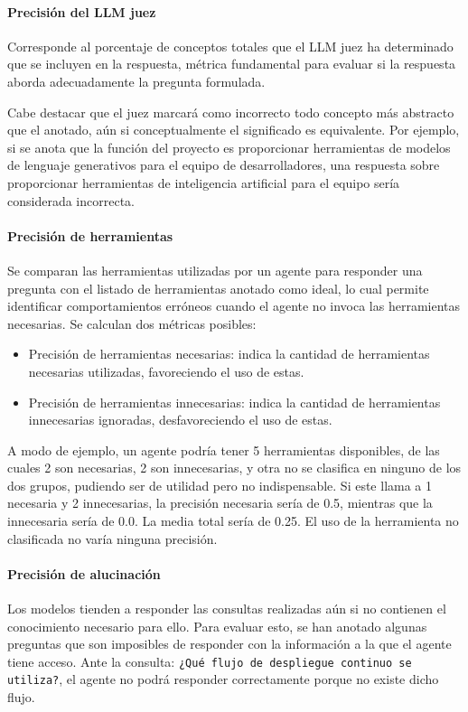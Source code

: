 \paragraph{Precisión del LLM juez} Corresponde al porcentaje de conceptos totales que el LLM juez ha determinado que se incluyen en la respuesta, métrica fundamental para evaluar si la respuesta aborda adecuadamente la pregunta formulada.

Cabe destacar que el juez marcará como incorrecto todo concepto más abstracto que el anotado, aún si conceptualmente el significado es equivalente. Por ejemplo, si se anota que la función del proyecto es proporcionar herramientas de modelos de lenguaje generativos para el equipo de desarrolladores, una respuesta sobre proporcionar herramientas de inteligencia artificial para el equipo sería considerada incorrecta.

\paragraph{Precisión de herramientas} Se comparan las herramientas utilizadas por un agente para responder una pregunta con el listado de herramientas anotado como ideal, lo cual permite identificar comportamientos erróneos cuando el agente no invoca las herramientas necesarias. Se calculan dos métricas posibles:

\begin{itemize}
\item Precisión de herramientas necesarias: indica la cantidad de herramientas necesarias utilizadas, favoreciendo el uso de estas.
\item Precisión de herramientas innecesarias: indica la cantidad de herramientas innecesarias ignoradas, desfavoreciendo el uso de estas.
\end{itemize}

A modo de ejemplo, un agente podría tener 5 herramientas disponibles, de las cuales 2 son necesarias, 2 son innecesarias, y otra no se clasifica en ninguno de los dos grupos, pudiendo ser de utilidad pero no indispensable. Si este llama a 1 necesaria y 2 innecesarias, la precisión necesaria sería de 0.5, mientras que la innecesaria sería de 0.0. La media total sería de 0.25. El uso de la herramienta no clasificada no varía ninguna precisión.

\paragraph{Precisión de alucinación} Los modelos tienden a responder las consultas realizadas aún si no contienen el conocimiento necesario para ello. Para evaluar esto, se han anotado algunas preguntas que son imposibles de responder con la información a la que el agente tiene acceso. Ante la consulta: \texttt{¿Qué flujo de despliegue continuo se utiliza?}, el agente no podrá responder correctamente porque no existe dicho flujo.

